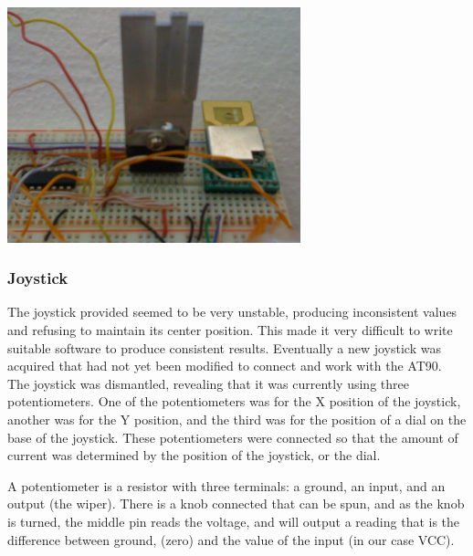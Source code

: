 \begin{minipage}{6.5in}
\begin{center}
  \includegraphics[width=85mm]{imageSources/designProblemsHBridgeHeatsink.png}
\end{center}
\label{HBridgeHeatsink}
\end{minipage}

\subsubsection{Joystick}
\label{sec:JoystickConst}
The joystick provided seemed to be very unstable, producing inconsistent values and refusing to maintain its center position. This made it very difficult to write suitable software to produce consistent results. Eventually a new joystick was acquired that had not yet been modified to connect and work with the AT90. The joystick was dismantled, revealing that it was currently using three potentiometers. One of the potentiometers was for the X position of the joystick, another was for the Y position, and the third was for the position of a dial on the base of the joystick. These potentiometers were connected so that the amount of current was determined by the position of the joystick, or the dial.

A potentiometer is a resistor with three terminals: a ground, an input, and an output (the wiper). There is a knob connected that can be spun, and as the knob is turned, the middle pin reads the voltage, and will output a reading that is the difference between ground, (zero) and the value of the input (in our case VCC).

